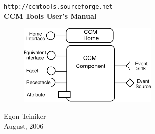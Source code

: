 \begin{titlepage}
\begin{center}

  	\vspace*{3cm}
  	{\LARGE \tt http://ccmtools.sourceforge.net} \\
  	\vspace{2cm}
  	{\huge \bf CCM Tools User's Manual} \\
  	\vspace{15mm}

	\begin{figure}[htbp]
		\begin{center}
			\includegraphics[height=4cm,angle=0] {figures/CCMSymbol}
	  	\end{center}
	\end{figure}
  	
  	\vspace{1cm}
  	{\LARGE Egon Teiniker} \\
  	
  	\vspace{15mm}
  	{\large August, 2006} 

\end{center}
\end{titlepage}